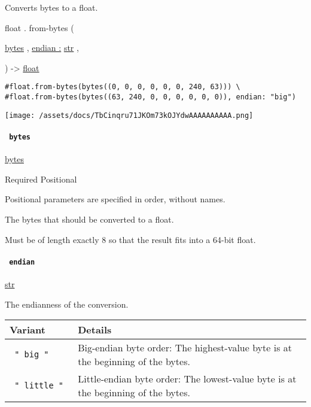 Converts bytes to a float.

float { . } { from-bytes } (

{ \href{/docs/reference/foundations/bytes/}{bytes} , } {
\hyperref[definitions-from-bytes-parameters-endian]{endian :}
\href{/docs/reference/foundations/str/}{str} , }

) -\textgreater{} \href{/docs/reference/foundations/float/}{float}

\begin{verbatim}
#float.from-bytes(bytes((0, 0, 0, 0, 0, 0, 240, 63))) \
#float.from-bytes(bytes((63, 240, 0, 0, 0, 0, 0, 0)), endian: "big")
\end{verbatim}

\texttt{[image: /assets/docs/TbCinqru71JKOm73kOJYdwAAAAAAAAAA.png]}

\paragraph{\texorpdfstring{\texttt{\ bytes\ }}{ bytes }}\label{definitions-from-bytes-bytes}

\href{/docs/reference/foundations/bytes/}{bytes}

{Required} {{ Positional }}

\label{definitions-from-bytes-bytes-positional-tooltip}
Positional parameters are specified in order, without names.

The bytes that should be converted to a float.

Must be of length exactly 8 so that the result fits into a 64-bit float.

\paragraph{\texorpdfstring{\texttt{\ endian\ }}{ endian }}\label{definitions-from-bytes-endian}

\href{/docs/reference/foundations/str/}{str}

The endianness of the conversion.

\begin{longtable}[]{@{}ll@{}}
\toprule\noalign{}
Variant & Details \\
\midrule\noalign{}
\endhead
\bottomrule\noalign{}
\endlastfoot
\texttt{\ "\ big\ "\ } & Big-endian byte order: The highest-value byte
is at the beginning of the bytes. \\
\texttt{\ "\ little\ "\ } & Little-endian byte order: The lowest-value
byte is at the beginning of the bytes. \\
\end{longtable}

